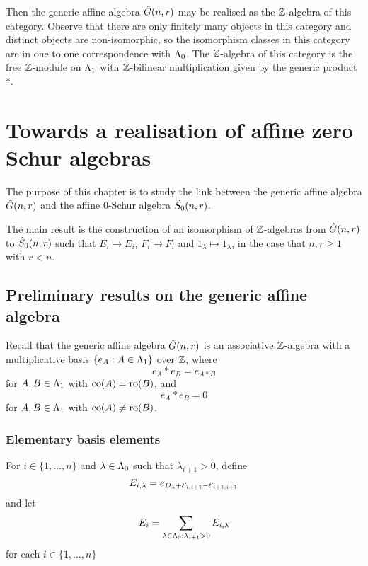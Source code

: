 \documentclass[a4paper, 11pt]{report}
\begin{document}
Then the generic affine algebra $\hat{G}(n,r)$ may be realised as the $\mathbb{Z}$-algebra of this category. Observe that there are only finitely many objects in this category and distinct objects are non-isomorphic, so the isomorphism classes in this category are in one to one correspondence with $\Lambda_0{}$. The $\mathbb{Z}$-algebra of this category is the free $\mathbb{Z}$-module on $\Lambda_1{}$ with $\mathbb{Z}$-bilinear multiplication given by the generic product $\ast$.



\chapter{Towards a realisation of affine zero Schur algebras}

The purpose of this chapter is to study the link between the generic affine algebra $\hat{G}(n,r)$ and the affine $0$-Schur algebra $\hat{S}_0(n,r)$.

The main result is the construction of an isomorphism of $\mathbb{Z}$-algebras from $\hat{G}(n,r)$ to $\hat{S}_0(n,r)$ such that $E_i\mapsto E_i$, $F_i\mapsto F_i$ and $1_\lambda\mapsto 1_\lambda$, in the case that $n,r\geq 1$ with $r<n$.

\section{Preliminary results on the generic affine algebra}

Recall that the generic affine algebra $\hat{G}(n,r)$ is an associative $\mathbb{Z}$-algebra with a multiplicative basis $\{e_A:A\in\Lambda_1{}\}$ over $\mathbb{Z}$, where
\begin{equation*}
e_A\ast e_B = e_{A\ast B}
\end{equation*}
for $A,B\in\Lambda_1{}$ with $\operatorname{co}(A)=\operatorname{ro}(B)$, and
\begin{equation*}
e_A\ast e_B = 0
\end{equation*}
for $A,B\in\Lambda_1{}$ with $\operatorname{co}(A)\neq\operatorname{ro}(B)$.

\subsection{Elementary basis elements}

For $i\in\{1,\ldots,n\}$ and $\lambda\in\Lambda_0{}$ such that $\lambda_{i+1}>0$, define
\begin{equation*}
E_{i,\lambda} = e_{D_{\lambda} + \mathcal{E}_{i,i+1} - \mathcal{E}_{i+1,i+1}}
\end{equation*}
and let
\begin{equation*}
E_i = \sum_{\lambda\in\Lambda_0{}:\lambda_{i+1}>0} E_{i,\lambda}
\end{equation*}
for each $i\in\{1,\ldots,n\}$
\end{document}
